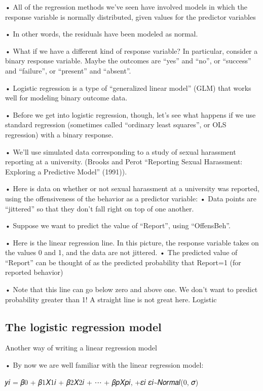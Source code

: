 \documentclass[
  letterpaper,
  DIV=11,
  numbers=noendperiod]{scrreprt}
\begin{document}
• All of the regression methods we've seen have involved models in which
the response variable is normally distributed, given values for the
predictor variables

• In other words, the residuals have been modeled as normal.

• What if we have a different kind of response variable? In particular,
consider a binary response variable. Maybe the outcomes are ``yes'' and
``no'', or ``success'' and ``failure'', or ``present'' and ``absent''.

• Logistic regression is a type of ``generalized linear model'' (GLM)
that works well for modeling binary outcome data.

• Before we get into logistic regression, though, let's see what happens
if we use standard regression (sometimes called ``ordinary least
squares'', or OLS regression) with a binary response.

• We'll use simulated data corresponding to a study of sexual harassment
reporting at a university. (Brooks and Perot ``Reporting Sexual
Harassment: Exploring a Predictive Model'' (1991)).

• Here is data on whether or not sexual harassment at a university was
reported, using the offensiveness of the behavior as a predictor
variable: • Data points are ``jittered'' so that they don't fall right
on top of one another.

• Suppose we want to predict the value of ``Report'', using
``OffensBeh''.

• Here is the linear regression line. In this picture, the response
variable takes on the values 0 and 1, and the data are not jittered. •
The predicted value of ``Report'' can be thought of as the predicted
probability that Report=1 (for reported behavior)

• Note that this line can go below zero and above one. We don't want to
predict probability greater than 1! A straight line is not great here.
Logistic

\hypertarget{the-logistic-regression-model}{%
\subsection{The logistic regression
model}\label{the-logistic-regression-model}}

Another way of writing a linear regression model

• By now we are well familiar with the linear regression model:

𝑦𝑖 = 𝛽0 + 𝛽1𝑋1𝑖 + 𝛽2𝑋2𝑖 + ⋯ + 𝛽𝑝𝑋𝑝𝑖, +𝜀𝑖 𝜀𝑖\textasciitilde 𝑁𝑜𝑟𝑚𝑎𝑙(0, 𝜎)
\end{document}

